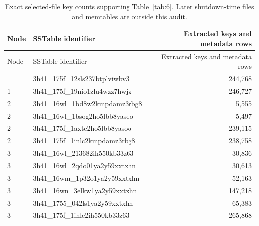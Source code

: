 \begin{longtable}[]{@{}llr@{}}
\caption{Exact selected-file key counts supporting
Table~\ref{tab:6}. Later shutdown-time files and
memtables are outside this audit. \label{tab:D1}}\tabularnewline
\toprule\noalign{}
Node & SSTable identifier & Extracted keys and metadata rows \\
\midrule\noalign{}
\endfirsthead
\toprule\noalign{}
Node & SSTable identifier & Extracted keys and metadata rows \\
\midrule\noalign{}
\endhead
\bottomrule\noalign{}
\endlastfoot
1 & 3h41\_175f\_12sls237btplviwbv3 & 244,768 \\
1 & 3h41\_175f\_19nio1zlu4wzz7hwjz & 246,727 \\
2 & 3h41\_16wl\_1bd8w2kmpdamz3rbg8 & 5,555 \\
2 & 3h41\_16wl\_1bsog2ho5lbb8yasoo & 5,497 \\
2 & 3h41\_175f\_1axtc2ho5lbb8yasoo & 239,115 \\
2 & 3h41\_175f\_1inlc2kmpdamz3rbg8 & 238,758 \\
3 & 3h41\_16wl\_213682ih550kb33z63 & 30,836 \\
3 & 3h41\_16wl\_2qdo01ya2y59xxtxhn & 30,613 \\
3 & 3h41\_16wm\_1p32o1ya2y59xxtxhn & 52,163 \\
3 & 3h41\_16wn\_3elkw1ya2y59xxtxhn & 147,218 \\
3 & 3h41\_1755\_042ls1ya2y59xxtxhn & 65,383 \\
3 & 3h41\_175f\_1inlc2ih550kb33z63 & 265,868 \\
\end{longtable}
